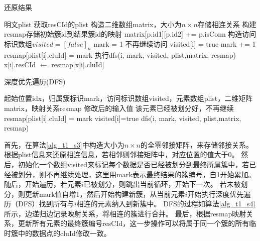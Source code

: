 \begin{algorithm}[htbp]
	\renewcommand{\algorithmicrequire}{\textbf{输入:}}
	\renewcommand{\algorithmicensure}{\textbf{输出:}}
	\caption{还原结果}
	\label{alg_t1_s3}
	\begin{algorithmic}[1]
		\REQUIRE 明文plist
		\ENSURE 获取resCId的plist
		\STATE 构造二维数组matrix，大小为$ n\times n $存储相连关系
		\STATE 构建resmap存储初始簇id到结果簇id的映射
		\STATE matrix[p.id1][p.id2] += p.isConn
		\ENDFOR
		\STATE 构造访问标识数组$ visited=[false]_n $
		\STATE mark = 1
		\STATE 不再继续访问
		\ENDIF
		\STATE visited[i] = true
		\STATE mark += 1
		\STATE resmap[plist[i].cluId] = mark
		\STATE 执行dfs(i, mark, visited, plist,matrix, resmap)
		\ENDFOR
		\STATE x[i].resCId $\leftarrow$ resmap[x[i].cluId]
		\ENDIF
		\ENDFOR
	\end{algorithmic}
\end{algorithm}

\begin{algorithm}[htbp]
	\renewcommand{\algorithmicrequire}{\textbf{输入:}}
	\renewcommand{\algorithmicensure}{\textbf{输出:}}
	\caption{深度优先遍历(DFS)}
	\label{alg_t1_s4}
	\begin{algorithmic}[1]
		\REQUIRE 起始位置idx，归属簇标识mark，访问标识数组visited，元素数组plist，二维矩阵matrix，映射关系resmap
		\ENSURE 修改后的输入值
		\STATE 该元素已经被划分好，不再继续
		\ENDIF
		\STATE resmap[plist[i].cluId] = mark
		\STATE visited[i]=true
		\STATE dfs(i, mark, visited, plist,matrix, resmap)
		\ENDIF
		\ENDFOR
	\end{algorithmic}
\end{algorithm}

首先，在算法\ref{alg_t1_s3}中构造大小为$ n \times n $的全零邻接矩阵，来存储邻接关系。
根据plist信息来还原相连信息，若相邻则邻接矩阵中，对应位置的值大于0。
然后，初始化一个数组visited来标记每个数据是否已经被划分到最终所属簇中，若已经被划分，则不再继续处理，这里用mark表示最终结果的簇编号，自1开始累加。
随后，开始遍历，若元素$i$已被划分，则跳出当前循环，开始下一次。
若未被划分，则更新mark值自增1，然后开始构建新簇，从当前元素$ i $开始执行深度优先遍历（DFS）找到所有与$ i $相连的元素纳入到新簇中。
DFS的过程如算法\ref{alg_t1_s4}所示，边递归边记录映射关系，将相连的簇进行合并。
最后，根据resmap映射关系，更新所有元素的最终簇编号resCId，这一步操作可以将属于同一个簇的所有临时簇中的数据点的cluId修改一致。

